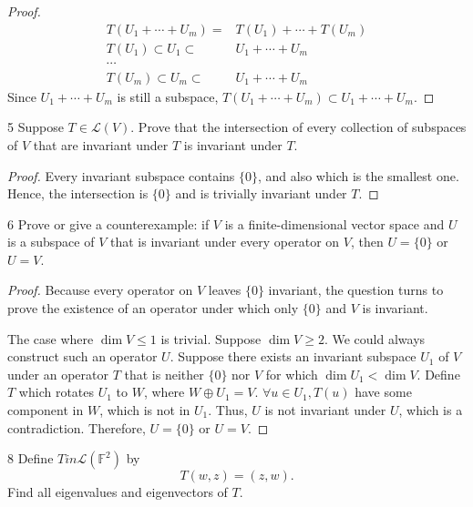 \documentclass{article}
\newenvironment{problem}[1]{\begin{prob*}{#1}{}}{\end{prob*}}
\begin{document}
\begin{proof}
\begin{align*}
T(U_1 + \cdots+ U_m) =& T(U_1) + \cdots + T(U_m) \\
T(U_1) \subset U_1 \subset& U_1 + \cdots + U_m\\
\cdots \\
T(U_m) \subset U_m \subset& U_1 + \cdots + U_m
\end{align*}
Since $U_1 + \cdots + U_m$ is still a subspace, $T(U_1 + \cdots + U_m) \subset U_1 + \cdots + U_m$.
\end{proof}

\newpage

\begin{problem}{5}
Suppose $T \in \mathcal{L}(V)$. Prove that the intersection of every collection of subspaces of $V$ that are invariant under $T$ is invariant under $T$.
\end{problem}

\begin{proof}
Every invariant subspace contains $\{0\}$, and also which is the smallest one. Hence, the intersection is $\{0\}$ and is trivially invariant under $T$.
\end{proof}

\begin{problem}{6}
Prove or give a counterexample: if $V$ is a finite-dimensional vector space and $U$ is a subspace of $V$ that is invariant under every operator on $V$, then $U = \{0\}$ or $U = V$.
\end{problem}

\begin{proof}
  Because every operator on $V$ leaves $\{0\}$ invariant, the question turns to prove the existence of an operator under which only $\{0\}$ and $V$ is invariant.

  The case where $\operatorname{dim} V \le 1$ is trivial.
  Suppose $\operatorname{dim} V \ge 2$. We could always construct such an operator $U$. Suppose there exists an invariant subspace $U_1$ of $V$ under an operator $T$ that is neither $\{0\}$ nor $V$ for which $\operatorname{dim} U_1 < \operatorname{dim} V$. Define $T$ which rotates $U_1$ to $W$, where $W \oplus U_1 = V$. $\forall u \in U_1, T(u)$ have some component in $W$, which is not in $U_1$. Thus, $U$ is not invariant under $U$, which is a contradiction. Therefore, $U = \{0\}$ or $U = V$.
\end{proof}

\begin{problem}{8}
Define $T in \mathcal{L}(\mathbb{F}^2)$ by \[
  T(w,z) = (z,w).\]
Find all eigenvalues and eigenvectors of $T$.
\end{problem}

\end{document}
